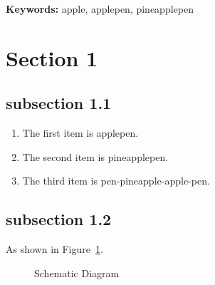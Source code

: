 \documentclass[10pt,letterpaper,onecolumn,fontset=none]{ctexart} %
\begin{document}
\newpage
\tableofcontents %
\thispagestyle{empty}
\newpage

\maketitle %
\begin{abstract}
	\lipsum[3]
\end{abstract}
\noindent \textbf{Keywords: } apple, applepen, pineapplepen


\section{Section 1}
\lipsum[17] %
\subsection{subsection 1.1}
\lipsum[16]
\begin{enumerate}[itemindent=0pt,topsep=0pt,leftmargin=*,parsep=0pt,itemsep=0pt,label=(\arabic*)]
	\item The first item is applepen.
	\item The second item is pineapplepen.
	\item The third item is pen-pineapple-apple-pen.
\end{enumerate}

\subsection{subsection 1.2}
\lipsum[11] %
As shown in Figure~\ref{fig1}.

\begin{figure}[H]	\centering
	\vfill
	\qquad
	\caption{Schematic Diagram} %
	\label{fig1} 
\end{figure}
\end{document}
